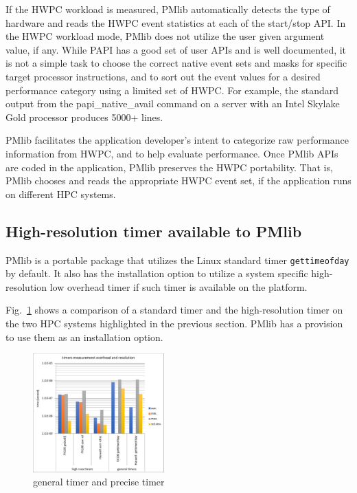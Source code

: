 \documentclass[conference]{IEEEtran}
\begin{document}
If the HWPC workload is measured,
PMlib automatically detects the type of hardware and reads the HWPC
event statistics at each of the start/stop API.
In the HWPC workload mode, PMlib does not utilize the user given argument value,
if any.
While PAPI has a good set of user APIs and is well documented,
it is not a simple task to choose the correct native event sets and masks
for specific target processor instructions, and to sort out the event
values for a desired performance category using a limited set of HWPC.
For example,
the standard output from the papi\_native\_avail command on a server with
an Intel Skylake Gold processor produces 5000+ lines.

PMlib facilitates the application developer's intent to
categorize raw performance information from HWPC, and to
help evaluate performance.
Once PMlib APIs are coded in the application, PMlib preserves the HWPC
portability. That is, PMlib chooses and reads the appropriate HWPC event
set, if the application runs on different HPC systems.

\subsection{High-resolution timer available to PMlib}
PMlib is a portable package that utilizes the Linux standard timer
{\tt gettimeofday} by default. It also has the installation option to utilize
a system specific high-resolution low overhead timer if such timer is
available on the platform.

Fig.~\ref{fig:precise-timer} shows a comparison of a standard timer and
the high-resolution timer on the two HPC systems highlighted in the
previous section.
PMlib has a provision to use them as an installation option.

\begin{figure}[tb]
\centering
\includegraphics[width=0.45\textwidth]{figs/precise-timer.pdf}
\caption{general timer and precise timer}
\label{fig:precise-timer}
\end{figure}
\end{document}
